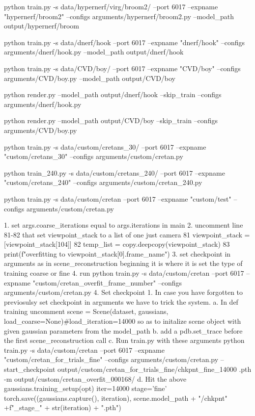 python train.py -s data/hypernerf/virg/broom2/ --port 6017 --expname "hypernerf/broom2" --configs arguments/hypernerf/broom2.py  --model_path output/hypernerf/broom

python train.py -s data/dnerf/hook --port 6017 --expname "dnerf/hook" --configs arguments/dnerf/hook.py  --model_path output/dnerf/hook

python train.py -s data/CVD/boy/ --port 6017 --expname "CVD/boy" --configs arguments/CVD/boy.py  --model_path output/CVD/boy

python render.py --model_path output/dnerf/hook --skip_train --configs arguments/dnerf/hook.py 

python render.py --model_path output/CVD/boy --skip_train --configs arguments/CVD/boy.py

python train.py -s data/custom/cretans_30/ --port 6017 --expname "custom/cretans_30" --configs arguments/custom/cretan.py

python train_240.py -s data/custom/cretans_240/ --port 6017 --expname "custom/cretans_240" --configs arguments/custom/cretan_240.py

python train.py -s data/custom/cretan --port 6017 --expname "custom/test" --configs arguments/custom/cretan.py


1. set args.coarse_iterations equal to args.iterations in main
2. uncomment line 81-82 that set viewpoint_stack to a list of
one just camera 
 81 viewpoint_stack = [viewpoint_stack[104]]
 82 temp_list = copy.deepcopy(viewpoint_stack)
 83 print(f"overfitting to {viewpoint_stack[0].frame_name}")
3. set checkpoint in arguments as in scene_reconstruction beginning
it is where it is set the type of training coarse or fine
4. run 
 python train.py -s data/custom/cretan --port 6017 --expname "custom/cretan_overfit_{frame_number}" --configs arguments/custom/cretan.py
4. Set checkpoint
1. In case you have forgotten to previosulsy set checkpoint in arguments we have to
trick the system.
a.
    In def training uncomment 
    scene = Scene(dataset, gaussians, load_coarse=None)#load_iteration=14000
    so as to initalize scene object with given gaussian parameters from the model_path
b. add a pdb.set_trace before the first scene_reconstruction call 
c.  Run train.py with these arguments
    python train.py -s data/custom/cretan --port 6017 --expname "custom/cretan_for_trials_fine" --configs     arguments/custom/cretan.py --start_checkpoint output/custom/cretan_for_trials_fine/chkpnt_fine_14000    .pth -m output/custom/cretan_overfit_000168/
d. Hit the above
    gaussians.training_setup(opt)
    iter=14000
    stage='fine'
    torch.save((gaussians.capture(), iteration), scene.model_path + "/chkpnt" +f"_{stage}_" + str(iteration) + ".pth")

